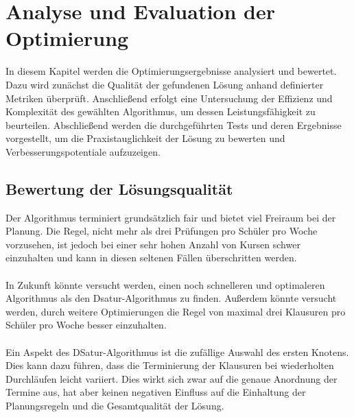 \newpage

\section{Analyse und Evaluation der Optimierung}
In diesem Kapitel werden die Optimierungsergebnisse analysiert und bewertet. Dazu wird zunächst die Qualität der gefundenen Lösung anhand definierter Metriken überprüft. Anschließend erfolgt eine Untersuchung der Effizienz und Komplexität des gewählten Algorithmus, um dessen Leistungsfähigkeit zu beurteilen. Abschließend werden die durchgeführten Tests und deren Ergebnisse vorgestellt, um die Praxistauglichkeit der Lösung zu bewerten und Verbesserungspotentiale aufzuzeigen.
\subsection{Bewertung der Lösungsqualität}
Der Algorithmus terminiert grundsätzlich fair und bietet viel Freiraum bei der Planung. Die Regel, nicht mehr als drei Prüfungen pro Schüler pro Woche vorzusehen, ist jedoch bei einer sehr hohen Anzahl von Kursen schwer einzuhalten und kann in diesen seltenen Fällen überschritten werden.\\\\
In Zukunft könnte versucht werden, einen noch schnelleren und optimaleren Algorithmus als den Dsatur-Algorithmus zu finden. Außerdem könnte versucht werden, durch weitere Optimierungen die Regel von maximal drei Klausuren pro Schüler pro Woche besser einzuhalten.\\\\
Ein Aspekt des DSatur-Algorithmus ist die zufällige Auswahl des ersten Knotens. Dies kann dazu führen, dass die Terminierung der Klausuren bei wiederholten Durchläufen leicht variiert. Dies wirkt sich zwar auf die genaue Anordnung der Termine aus, hat aber keinen negativen Einfluss auf die Einhaltung der Planungsregeln und die Gesamtqualität der Lösung.

